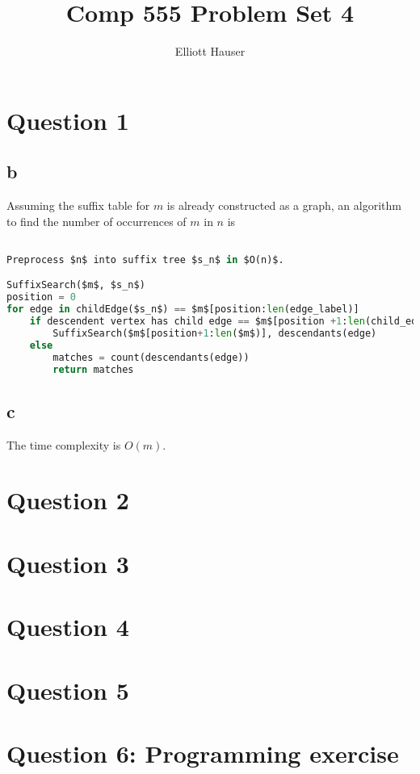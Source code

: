 \documentclass[12pt]{article}
\author{Elliott Hauser}
\title{Comp 555 Problem Set 4}
\begin{document}
\maketitle
\section*{Question 1}
\subsection*{b} Assuming the suffix table for $m$ is already constructed as a graph, an algorithm to find the number of occurrences of $m$ in $n$ is
\begin{lstlisting}[language=python, mathescape=true]

Preprocess $n$ into suffix tree $s_n$ in $O(n)$.

SuffixSearch($m$, $s_n$)
position = 0
for edge in childEdge($s_n$) == $m$[position:len(edge_label)]
	if descendent vertex has child edge == $m$[position +1:len(child_edge_label)]
		SuffixSearch($m$[position+1:len($m$)], descendants(edge)
	else
		matches = count(descendants(edge))
		return matches

\end{lstlisting}

\subsection*{c}  The time complexity is %
$O(m)$.

\section*{Question 2}

\section*{Question 3}

\section*{Question 4}

\section*{Question 5}

\section*{Question 6: Programming exercise}
\end{document}
